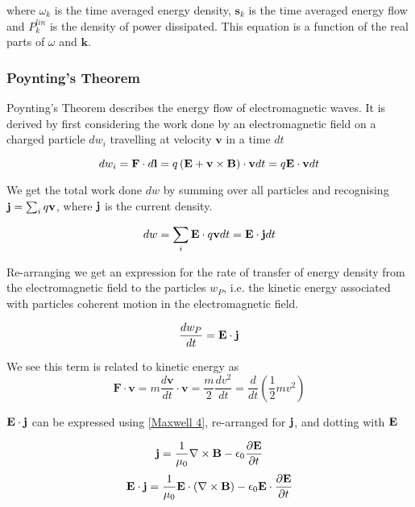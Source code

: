 where $\omega_k$ is the time averaged energy density, $\textbf{s}_k$ is the time averaged energy flow and $P_k^{lin}$ is the density of power dissipated. This equation is a function of the real parts of $\omega$ and $\textbf{k}$.

\subsubsection{Poynting's Theorem}
Poynting's Theorem describes the energy flow of electromagnetic waves. It is derived by first considering the work done by an electromagnetic field on a charged particle $dw_i$ travelling at velocity $\textbf{v}$ in a time $dt$

\begin{equation}
	d w_i = \textbf{F} \cdot d\textbf{l} = q\left( \textbf{E} + \textbf{v} \times \textbf{B} \right) \cdot \textbf{v} dt = q \textbf{E} \cdot \textbf{v} dt
\end{equation}

We get the total work done $dw$ by summing over all particles and recognising $\textbf{j} = \sum_{i}q \textbf{v}$, where $\textbf{j}$ is the current density.

\begin{equation}
	dw = \sum_{i} \textbf{E} \cdot q \textbf{v} dt = \textbf{E} \cdot \textbf{j} dt
\end{equation}

Re-arranging we get an expression for the rate of transfer of energy density from the electromagnetic field to the particles $w_{P}$, i.e. the kinetic energy associated with particles coherent motion in the electromagnetic field.

\begin{equation}
	\frac{dw_{P}}{dt} = \textbf{E} \cdot \textbf{j}
\end{equation}

We see this term is related to kinetic energy as
\begin{equation}
	\textbf{F} \cdot \textbf{v} = m\frac{d \textbf{v}}{dt} \cdot \textbf{v} = \frac{m}{2} \frac{d v^2}{dt} = \frac{d}{dt} \left( \frac{1}{2} m v^2  \right)
\end{equation}

$\textbf{E} \cdot \textbf{j}$ can be expressed using \eqref{Maxwell 4}, re-arranged for $\textbf{j}$, and dotting with $\textbf{E}$

\begin{equation*}
	\textbf{j} = \frac{1}{\mu_0} \nabla \times \textbf{B} - \epsilon_0 \frac{\partial \textbf{E}}{\partial t}
\end{equation*}
\begin{equation}
	\textbf{E} \cdot \textbf{j} = \frac{1}{\mu_0} \textbf{E} \cdot \left(\nabla \times \textbf{B} \right) - \epsilon_0 \textbf{E} \cdot \frac{\partial \textbf{E}}{\partial t}
\end{equation}

